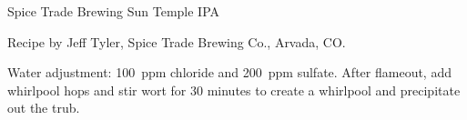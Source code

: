 \begin{recipe}{Spice Trade Brewing Sun Temple IPA}

\begin{aboutblock}
Recipe by Jeff Tyler, Spice Trade Brewing Co., Arvada, CO.
\end{aboutblock}


\begin{methodandtiming}
 
\begin{mashsteps}
\end{mashsteps}

\begin{fermentationsteps}
\end{fermentationsteps}

\begin{directions}
Water adjustment: 100~ppm chloride and 200~ppm sulfate. After flameout,
add whirlpool hops and stir wort for 30 minutes to create a whirlpool and
precipitate out the trub.
\end{directions}

\end{methodandtiming}

\recipebreak

\begin{ingredientsblock}

\begin{malts}
\end{malts}

\begin{hops}
\end{hops}


\end{ingredientsblock}
\end{recipe}
